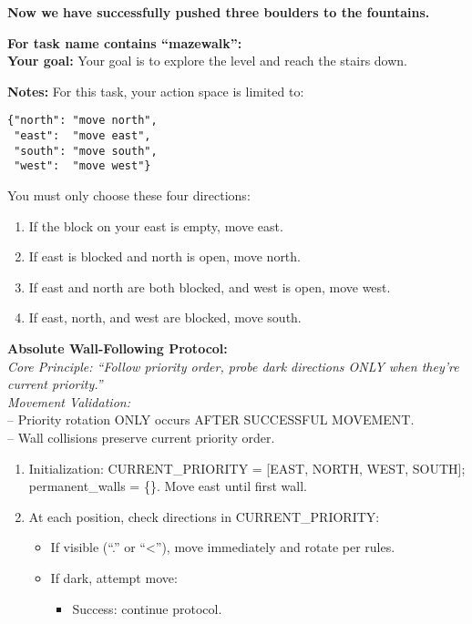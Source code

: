 \begin{MyGreenBox}
{	\textbf{Now we have successfully pushed three boulders to the fountains.}


	\textbf{For task name contains “mazewalk”:}\\ \textbf{Your goal:} Your goal is to explore the level and reach the stairs down.

	\textbf{Notes:} For this task, your action space is limited to: \begin{verbatim}
{"north": "move north",
 "east":  "move east",
 "south": "move south",
 "west":  "move west"}
\end{verbatim}

	You must only choose these four directions:

	\begin{enumerate}\item If the block on your east is empty, move east.

	\item If east is blocked and north is open, move north.

	\item If east and north are both blocked, and west is open, move west.

	\item If east, north, and west are blocked, move south.\end{enumerate}


	\textbf{Absolute Wall-Following Protocol:}\\ \textit{Core Principle: “Follow priority order, probe dark directions ONLY when they're current priority.”}\\ \textit{Movement Validation:}\\ – Priority rotation ONLY occurs AFTER SUCCESSFUL MOVEMENT.\\ – Wall collisions preserve current priority order.

	\begin{enumerate}\item Initialization: CURRENT\_PRIORITY = [EAST, NORTH, WEST, SOUTH]; permanent\_walls = \{\}. Move east until first wall.

	\item At each position, check directions in CURRENT\_PRIORITY: \begin{itemize}\item If visible (“.” or “<”), move immediately and rotate per rules.

	\item If dark, attempt move: \begin{itemize}\item Success: continue protocol.


\end{itemize}
\end{itemize}
\end{enumerate}}
\end{MyGreenBox}
